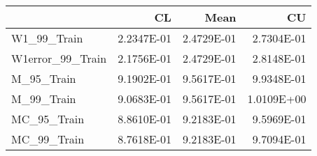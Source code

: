 \begin{tabular}{lrrr}
\toprule
{} &         CL &       Mean &         CU \\
\midrule
W1\_99\_Train      & 2.2347E-01 & 2.4729E-01 & 2.7304E-01 \\
W1error\_99\_Train & 2.1756E-01 & 2.4729E-01 & 2.8148E-01 \\
M\_95\_Train       & 9.1902E-01 & 9.5617E-01 & 9.9348E-01 \\
M\_99\_Train       & 9.0683E-01 & 9.5617E-01 & 1.0109E+00 \\
MC\_95\_Train      & 8.8610E-01 & 9.2183E-01 & 9.5969E-01 \\
MC\_99\_Train      & 8.7618E-01 & 9.2183E-01 & 9.7094E-01 \\
\bottomrule
\end{tabular}
